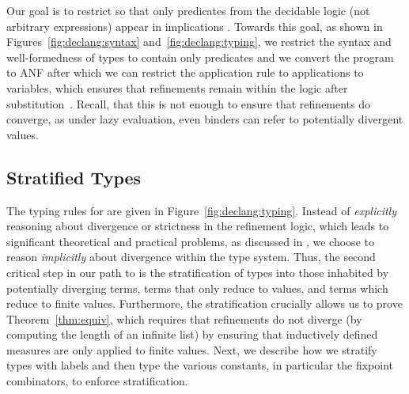 Our goal is to restrict \rimpl so that only predicates 
from the decidable logic \logiclang (not arbitrary expressions)
appear in implications .
%
Towards this goal, as shown in Figures~\ref{fig:declang:syntax}
and~\ref{fig:declang:typing}, 
we restrict the syntax and well-formedness of types to contain
only predicates
%
and we convert the program to ANF after which we can 
restrict the application rule \rtappd to applications 
to variables, which ensures that refinements remain 
within the logic after substitution~\cite{LiquidPLDI08}.
%
Recall, that this is not enough to ensure that refinements do converge, 
as under lazy evaluation,
even binders can refer to potentially divergent values.

\subsection{Stratified Types}\label{sec:typing:stratify}

The typing rules for \declang are given in Figure~\ref{fig:declang:typing}.
Instead of \emph{explicitly} reasoning about divergence or 
strictness in the refinement logic, which leads to significant
theoretical and practical problems, as discussed in , 
we choose to reason \emph{implicitly} about divergence within the type system.
%
Thus, the second critical step in our path to \declang is the 
stratification of types into those inhabited by potentially
diverging terms, terms that only reduce to values, and 
terms which reduce to finite values.
%
Furthermore, the stratification crucially allows us to prove 
Theorem~\ref{thm:equiv}, which requires that refinements do 
not diverge (\eg by computing the length of an infinite list)
by ensuring that inductively defined measures are only applied 
to finite values.
%
Next, we describe how we stratify types with labels and 
then type the various constants, in particular the fixpoint 
combinators, to enforce stratification.

